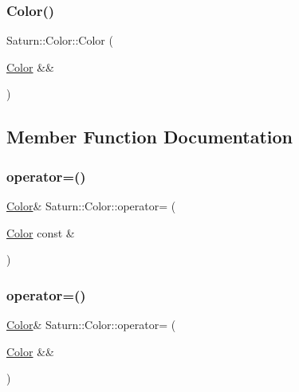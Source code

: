 \mbox{\label{class_saturn_1_1_color_ab7f1a79d5e3e2699c837aa1d3adfe643}} 
\subsubsection{\texorpdfstring{Color()}{Color()}\hspace{0.1cm}{\footnotesize\ttfamily [4/4]}}
{\footnotesize\ttfamily Saturn\+::\+Color\+::\+Color (\begin{DoxyParamCaption}\item[{\mbox{\hyperlink{class_saturn_1_1_color}{Color}} \&\&}]{ }\end{DoxyParamCaption})\hspace{0.3cm}{\ttfamily [default]}}



\subsection{Member Function Documentation}
\mbox{\label{class_saturn_1_1_color_ab5a31b5567d2b3ff91261304028a432d}} 
\subsubsection{\texorpdfstring{operator=()}{operator=()}\hspace{0.1cm}{\footnotesize\ttfamily [1/2]}}
{\footnotesize\ttfamily \mbox{\hyperlink{class_saturn_1_1_color}{Color}}\& Saturn\+::\+Color\+::operator= (\begin{DoxyParamCaption}\item[{\mbox{\hyperlink{class_saturn_1_1_color}{Color}} const \&}]{ }\end{DoxyParamCaption})\hspace{0.3cm}{\ttfamily [default]}}

\mbox{\label{class_saturn_1_1_color_ad7fa043c0e0d2bcd25530ad309cce1bc}} 
\subsubsection{\texorpdfstring{operator=()}{operator=()}\hspace{0.1cm}{\footnotesize\ttfamily [2/2]}}
{\footnotesize\ttfamily \mbox{\hyperlink{class_saturn_1_1_color}{Color}}\& Saturn\+::\+Color\+::operator= (\begin{DoxyParamCaption}\item[{\mbox{\hyperlink{class_saturn_1_1_color}{Color}} \&\&}]{ }\end{DoxyParamCaption})\hspace{0.3cm}{\ttfamily [default]}}



